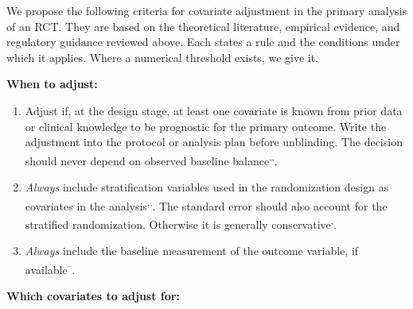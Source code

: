 \documentclass[
  11pt,
]{article}
\providecommand{\tightlist}{%
  \setlength{\itemsep}{0pt}\setlength{\parskip}{0pt}}
\begin{document}
We propose the following criteria for covariate
adjustment in the primary analysis of an RCT. They are
based on the theoretical literature, empirical
evidence, and regulatory guidance reviewed above. Each
states a rule and the conditions under which it
applies. Where a numerical threshold exists, we give
it.

\textbf{When to adjust:}

\begin{enumerate}
\def\labelenumi{\arabic{enumi}.}
\tightlist
\item
  Adjust if, at the design stage, at least one
  covariate is known from prior data or clinical
  knowledge to be prognostic for the primary outcome.
  Write the adjustment into the protocol or analysis
  plan before unblinding. The decision should never
  depend on observed baseline balance\textsuperscript{,,}.
\item
  \emph{Always} include stratification variables used in
  the randomization design as covariates in the
  analysis\textsuperscript{,,}. The standard error
  should also account for the stratified randomization.
  Otherwise it is generally conservative\textsuperscript{,}.
\item
  \emph{Always} include the baseline measurement of the
  outcome variable, if available\textsuperscript{--}.
\end{enumerate}

\textbf{Which covariates to adjust for:}
\end{document}
